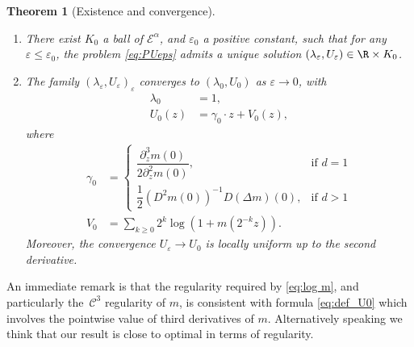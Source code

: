 \documentclass[10pt]{amsart}
\let\mathcal\mathscr
\newenvironment{enumeratei}
{\bgroup\def\theenumi{\roman{enumi}}\def\theenumii{\arabic{enumii}}\begin{enumerate}}
{\end{enumerate}\egroup}
\newcommand{\cC}{\mathcal{C}}
\theoremstyle{plain}
\newtheorem{thm}{Theorem}[section]
\theoremstyle{definition}
\let\eps\varepsilon
\let\ds\displaystyle
\newcommand{\Ea}{\mathcal{E}^\alpha}
\begin{document}
\begin{thm}[Existence and convergence]\label{convergence PUeps}\begin{enumeratei}
\item\label{convergence PUeps1}
There exist $K_0$ a ball of $\Ea$, and $\eps_0 $ a positive constant, such that for any $\eps \leq \eps_0$, the problem \eqref{eq:PUeps} admits a unique solution $(\lambda_\eps, U_\eps) \in \R \times K_0$.

\item\label{convergence PUeps2}
The family $(\lambda_\eps,U_ \eps)_{\eps}$ converges to $(\lambda_0,U_0)$ as $\eps\to0$, with
\begin{align}
\label{eq:def_lambda0} \lambda_0 & = 1, \\
\label{eq:def_U0} \ds U_0(z) & = \gamma_0 \cdot z + V_0(z),
\end{align}
where
\begin{equation}
\label{eq:gamma0value}
\begin{split}
\gamma_0 &=
\begin{cases}
\dfrac{\partial^3_z m(0)}{2 \partial ^2_z m(0)}, &\text{if } d=1 \\[10pt]
\dfrac{1}{2} \left (D^2 m(0)\right)^{-1} D (\Delta m)(0),&\text{if } d>1
\end{cases}\\[5pt]
V_0 &= \sum_{k\geq 0} 2^k \log \left(1 + m(2^{-k}z)\right).
\end{split}
\end{equation}
Moreover, the convergence $U_\eps \to U_0$ is locally uniform up to the second derivative.
\end{enumeratei}
\end{thm}


An immediate remark is that the regularity required by \eqref{eq:log m}, and particularly the~$\cC^3$ regularity of $m$, is consistent with formula \eqref{eq:def_U0} which involves the pointwise value of third derivatives of $m$. Alternatively speaking we think that our result is close to optimal in terms of regularity.
\end{document}
